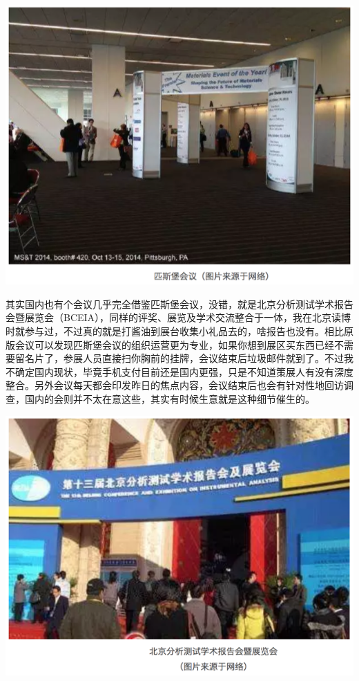 \documentclass[
]{book}
\begin{document}
\includegraphics[width=8.33in]{images/pittcon2}

其实国内也有个会议几乎完全借鉴匹斯堡会议，没错，就是北京分析测试学术报告会暨展览会（BCEIA），同样的评奖、展览及学术交流整合于一体，我在北京读博时就参与过，不过真的就是打酱油到展台收集小礼品去的，啥报告也没有。相比原版会议可以发现匹斯堡会议的组织运营更为专业，如果你想到展区买东西已经不需要留名片了，参展人员直接扫你胸前的挂牌，会议结束后垃圾邮件就到了。不过我不确定国内现状，毕竟手机支付目前还是国内更强，只是不知道策展人有没有深度整合。另外会议每天都会印发昨日的焦点内容，会议结束后也会有针对性地回访调查，国内的会则并不太在意这些，其实有时候生意就是这种细节催生的。

\includegraphics[width=8.33in]{images/pittcon3}
\end{document}
